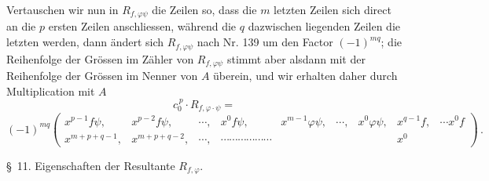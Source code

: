 Vertauschen wir nun in $R_{f,\varphi\psi}$ die Zeilen so, dass die $m$
letzten Zeilen sich direct an die $p$ ersten Zeilen anschliessen,
w\"ahrend die $q$ dazwischen liegenden Zeilen die letzten werden, dann
\"andert sich $R_{f,\varphi\psi}$ nach Nr. 139 um den Factor $(-1)^{mq}$;
die Reihenfolge der Gr\"ossen im Z\"ahler von $R_{f,\varphi\psi}$
stimmt aber alsdann mit der Reihenfolge der Gr\"ossen im Nenner von
$A$ \"uberein, und wir erhalten daher durch Multiplication mit $A$
\[
c_0^{\,p} \cdot R_{f,\varphi\cdot\psi} =
\]
\[
(-1)^{mq}
\begin{pmatrix}
x^{p-1}f\psi, & x^{p-2}f\psi, & \cdots, & x^0f\psi, & x^{m-1}\varphi\psi, & \cdots, & x^0\varphi\psi, & x^{q-1}f, & \cdots x^0f \\
x^{m+p+q-1}, & x^{m+p+q-2}, & \cdots, & \cdots\cdots\cdots\cdots\cdots\cdots & & & & x^0
\end{pmatrix}\,.
\]


\S\ 11. Eigenschaften der Resultante $R_{f,\varphi}$.

